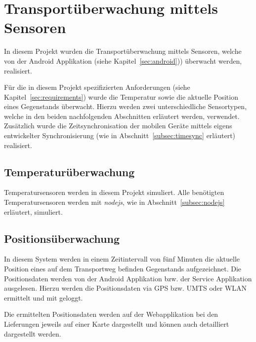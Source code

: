 \section{Transportüberwachung mittels Sensoren}\label{sensors}
\label{sec:sensors}

In diesem Projekt wurden die Transportüberwachung mittels Sensoren, welche
	von der Android Applikation (siehe Kapitel~\ref{sec:android})) überwacht
	werden, realisiert.
	
Für die in diesem Projekt spezifizierten Anforderungen (siehe Kapitel~\ref{sec:requirements})
	wurde die Temperatur sowie die aktuelle Position eines Gegenstands überwacht. Hierzu
	werden zwei unterschiedliche Sensortypen, welche in den beiden nachfolgenden Abschnitten
	erläutert werden, verwendet. Zusätzlich wurde die Zeitsynchronisation der mobilen Geräte
	mittels eigens entwickelter Synchronisierung (wie in Abschnitt~\ref{subsec:timesync}
	erläutert) realisiert.

\subsection{Temperaturüberwachung}

Temperatursensoren werden in diesem Projekt simuliert. Alle benötigten
	Temperatursensoren werden mit \emph{nodejs}, wie in
	Abschnitt~\ref{subsec:nodejs} erläutert, simuliert.

\subsection{Positionsüberwachung}

In diesem System werden in einem Zeitintervall von fünf Minuten die aktuelle
	Position eines auf dem Transportweg befinden Gegenstands aufgezeichnet.
	Die Positionsdaten werden von der Android Applikation bzw. der Service
	Applikation ausgelesen. Hierzu werden die Positionsdaten via GPS bzw. UMTS
	oder WLAN ermittelt und mit geloggt.
	
Die ermittelten Positionsdaten werden auf der Webapplikation bei den Lieferungen
	jeweils auf einer Karte dargestellt und können auch detailliert dargestellt
	werden.